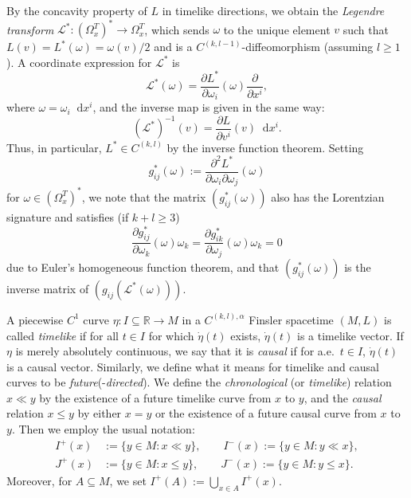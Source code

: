 \documentclass[a4paper,11pt]{article}
\numberwithin{equation}{section}
\theoremstyle{definition}
\theoremstyle{plain}
\newcommand{\R}{\mathbb R}
\newcommand*\diff{\mathop{}\!\mathrm{d}}
\begin{document}
By the concavity property of $L$ in timelike directions, we obtain the \emph{Legendre transform} $\mathcal{L}^*: (\Omega_x^T)^* \to \Omega_x^T$, which sends $\omega$ to the unique element $v$ such that $L(v) = L^*(\omega) = \omega(v)/2$ and is a $C^{(k,l-1)}$-diffeomorphism (assuming $l \geq 1$).
A coordinate expression for $\mathcal{L}^*$ is
\begin{equation*}
    \mathcal{L}^*(\omega) = \frac{\partial L^*}{\partial \omega_i}(\omega) \frac{\partial}{\partial x^i},
\end{equation*}
where $\omega=\omega_i \diff x^i$, and the inverse map is given in the same way:
\[
(\mathcal{L}^*)^{-1}(v) =\frac{\partial L}{\partial v^i}(v) \diff x^i.
\]
Thus, in particular, $L^* \in C^{(k,l)}$ by the inverse function theorem.
Setting
\begin{equation*}
    g^*_{ij}(\omega):=\frac{\partial^2 L^*}{\partial \omega_i \partial \omega_j}(\omega)
\end{equation*}
for $\omega \in (\Omega_x^T)^*$,
we note that the matrix $(g^*_{ij}(\omega))$ also has the Lorentzian signature and satisfies (if $k+l \geq 3$)
\begin{equation*}
    \frac{\partial g^*_{ij}}{\partial \omega_k}(\omega) \omega_k = \frac{\partial g^*_{ik}}{\partial \omega_j}(\omega) \omega_k = 0
\end{equation*}
due to Euler's homogeneous function theorem, and that $(g^*_{ij}(\omega))$ is the inverse matrix of $(g_{ij}(\mathcal{L}^*(\omega)))$.


A piecewise $C^1$ curve $\eta:I \subseteq \R \to M$ in a $C^{(k,l), \alpha}$ Finsler spacetime $(M,L)$ is called \emph{timelike} if for all $t \in I$ for which $\dot \eta(t)$ exists, $\dot \eta(t)$ is a timelike vector. If $\eta$ is merely absolutely continuous, we say that it is \emph{causal} if for a.e.\ $t \in I$, $\dot \eta(t)$ is a causal vector. Similarly, we define what it means for timelike and causal curves to be \emph{future}(-\emph{directed}).
We define the \emph{chronological} (or \emph{timelike}) relation $x \ll y$ by the existence of a future timelike curve from $x$ to $y$, and the \emph{causal} relation $x \leq y$ by either $x= y$ or the existence of a future causal curve from $x$ to $y$. 
Then we employ the usual notation:
\begin{align*}
I^+(x) &:=\{ y \in M : x \ll y \}, \qquad
I^-(x) :=\{ y \in M : y \ll x \}, \\
J^+(x) &:=\{ y \in M : x \le y \}, \qquad
J^-(x) :=\{ y \in M : y \le x \}.
\end{align*}
Moreover, for $A \subseteq M$, we set $I^+(A):=\bigcup_{x \in A} I^+(x)$.
\end{document}
